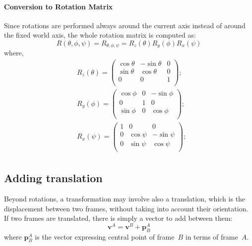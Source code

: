 \paragraph{Conversion to Rotation Matrix}
Since rotations are performed always around the current axis instead of around the fixed world axis, the whole rotation matrix is computed as:
\begin{equation}
 R(\theta,\phi,\psi) = R_{\theta,\phi,\psi} = R_z(\theta)R_y(\phi)R_x(\psi)
\end{equation}
where,
\begin{equation}
\begin{split}
 & R_z(\theta)=
\begin{pmatrix}
 \cos\theta  & -\sin\theta & 0 \\
 \sin\theta & \cos\theta & 0 \\
 0          & 0         & 1 \\
\end{pmatrix}; \\
 & R_y(\phi)=
\begin{pmatrix}
 \cos\phi  & 0 & -\sin\phi \\
 0	    & 1	& 0 \\
 \sin\phi  & 0 & \cos\phi \\
\end{pmatrix};\\
 & R_x(\psi)=
\begin{pmatrix}
 1	       & 0 	& 0 \\
 0 & \cos\psi & -\sin\psi \\
 0 & \sin\psi & \cos\psi \\
\end{pmatrix};\\
\end{split}
\label{appF:eq:R123} 
\end{equation}


\subsection{Adding translation}
Beyond rotations, a transformation may involve also a translation, which is the displacement between two frames, without taking into account their orientation. If two frames are translated, there is simply a vector to add between them: 
\begin{equation}
 \mathbf{v}^A = \mathbf{v}^B + \mathbf{p}^A_B
\end{equation}
where $\mathbf{p}^A_B$ is the vector expressing central point of frame~$B$ in terms of frame~$A$. 

